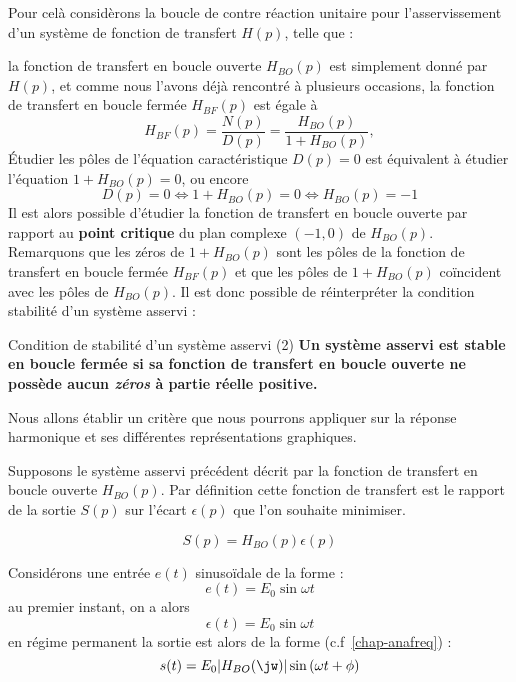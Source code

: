 Pour celà considèrons la boucle de contre réaction unitaire 
pour l'asservissement d'un système de fonction de transfert $H(p)$, telle que : 
\begin{center}
\end{center}

la fonction de transfert en boucle ouverte $H_{BO}(p)$ est simplement donné par $H(p)$, et comme nous l'avons 
déjà rencontré à plusieurs occasions, la fonction de transfert en boucle fermée $H_{BF}(p)$ est égale à 
$$
H_{BF}(p)=\dfrac{N(p)}{D(p)}=\dfrac{H_{BO}(p)}{1+H_{BO}(p)},
$$
\'Etudier les pôles de l'équation caractéristique $D(p)=0$ est équivalent à étudier l'équation $1+H_{BO}(p)=0$, ou encore
$$
D(p)=0\Leftrightarrow1+H_{BO}(p)=0\Leftrightarrow H_{BO}(p)=-1
$$
Il est alors possible d'étudier la fonction de transfert en boucle ouverte par rapport au \textbf{point critique}
du plan complexe $(-1,0)$ de $H_{BO}(p)$.
Remarquons que les zéros de $1+H_{BO}(p)$ sont les pôles de la fonction de transfert en boucle fermée $H_{BF}(p)$ et
que les pôles de $1+H_{BO}(p)$ co\"incident avec les pôles de $H_{BO}(p)$.
Il est donc possible de réinterpréter la condition stabilité d'un système asservi :

\begin{criteria}{Condition de stabilité d'un système asservi (2)}
    \textbf{Un système asservi est stable en boucle fermée si sa fonction de transfert 
    en boucle ouverte ne possède aucun \emph{zéros} à partie réelle positive.}
\end{criteria}

Nous allons établir un critère que nous pourrons appliquer sur la réponse harmonique et 
ses différentes représentations graphiques.

Supposons le système asservi précédent décrit 
par la fonction de transfert en boucle ouverte $H_{BO}(p)$. Par définition cette fonction 
de transfert est le rapport de la sortie $S(p)$ sur l'écart $\epsilon(p)$ que l'on souhaite minimiser.

$$
S(p)=H_{BO}(p)\epsilon(p)
$$

Considérons une entrée $e(t)$ sinuso\"idale de la forme :
$$
e(t)=E_0\sin{\omega t}
$$
au premier instant, on a alors 
$$
\epsilon(t)=E_0\sin{\omega t}
$$
en régime permanent la sortie est alors de la forme (c.f~\cref{chap-anafreq}) :
$$
s(t)=E_0|H_{BO}(\jw)|\sin{(\omega t+\phi)}
$$

